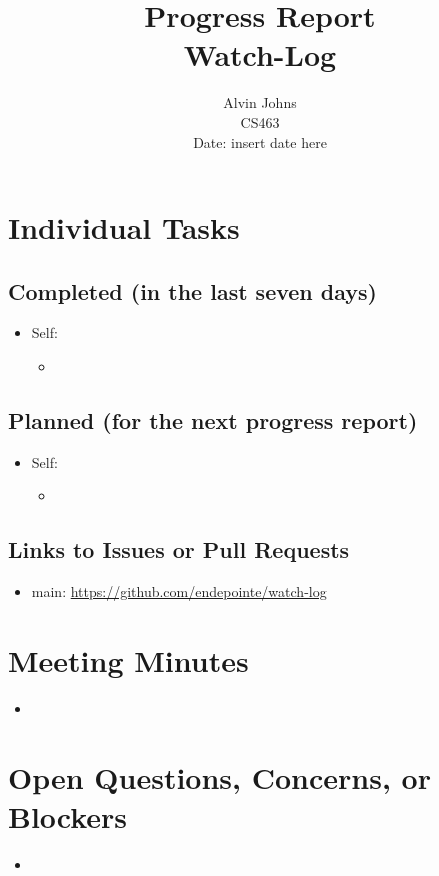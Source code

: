 \documentclass{article}
\title{Progress Report\\[0.5em]
\large Watch-Log}
\author{Alvin Johns\\
CS463\\
Date: insert date here}
\date{}
\begin{document}
\maketitle

\section*{Individual Tasks}
\subsection*{Completed (in the last seven days)}
\begin{itemize}[label={--}]
    \item Self:
        \begin{itemize}[label={}]
            \item
        \end{itemize}
\end{itemize}

\subsection*{Planned (for the next progress report)}
\begin{itemize}[label={--}]
    \item Self:
        \begin{itemize}[label={}]
            \item
        \end{itemize}
\end{itemize}

\subsection*{Links to Issues or Pull Requests}
\begin{itemize}[label={--}]
    \item main: \url{https://github.com/endepointe/watch-log}
\end{itemize}

\section*{Meeting Minutes}
\begin{itemize}[label={--}]
    \item
\end{itemize}

\section*{Open Questions, Concerns, or Blockers}
\begin{itemize}[label={--}]
    \item
\end{itemize}
\end{document}
